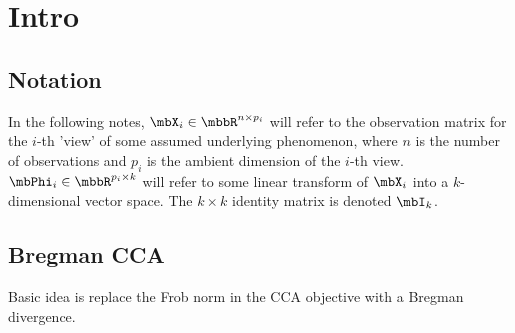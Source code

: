 \documentclass{article}
\begin{document}
\section{Intro} \label{sec:intro}

\subsection{Notation} \label{subsec:notation}

In the following notes, $\mbX_i \in \mbbR^{n \times p_i}$ will refer to the observation matrix for the $i$-th 'view' of some assumed underlying phenomenon, where $n$ is the number of observations and $p_i$ is the ambient dimension of the $i$-th view. $\mbPhi_i \in \mbbR^{p_i \times k}$ will refer to some linear transform of $\mbX_i$ into a $k$-dimensional vector space. The $k \times k$ identity matrix is denoted $\mbI_k$.

\subsection{Bregman CCA} \label{subsec:bregmancca}

Basic idea is replace the Frob norm in the CCA objective with a Bregman divergence.
	
	
	
\end{document}
